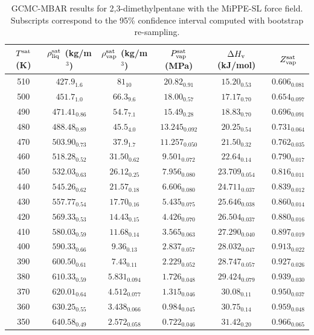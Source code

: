 \documentclass[journal=jctc,manuscript=article]{achemso}
\begin{document}
\begin{table}[htb!]
	\caption{GCMC-MBAR results for 2,3-dimethylpentane with the MiPPE-SL force field. Subscripts correspond to the 95\% confidence interval computed with bootstrap re-sampling.}
	\begin{center}
		\begin{tabular}{|c|c|c|c|c|c|}
			\hline
			$T^{\rm sat}$ (K) & $\rho_{\rm liq}^{\rm sat}$ (kg/m$^3$) & $\rho_{\rm vap}^{\rm sat}$ (kg/m$^3$) & $P_{\rm vap}^{\rm sat}$ (MPa) & $\Delta H_{\rm v}$ (kJ/mol) & $Z_{\rm vap}^{\rm sat}$ \\ \hline
			510 & $427.9_{1.6}$ & $81_{10}$ & $20.82_{0.91}$ & $15.20_{0.53}$ & $0.606_{0.081}$ \\
			500 & $451.7_{1.0}$ & $66.3_{9.6}$ & $18.00_{0.57}$ & $17.17_{0.70}$ & $0.654_{0.097}$ \\
			490 & $471.41_{0.86}$ & $54.7_{7.1}$ & $15.49_{0.28}$ & $18.83_{0.70}$ & $0.696_{0.091}$ \\
			480 & $488.48_{0.89}$ & $45.5_{4.0}$ & $13.245_{0.092}$ & $20.25_{0.54}$ & $0.731_{0.064}$ \\
			470 & $503.90_{0.73}$ & $37.9_{1.7}$ & $11.257_{0.050}$ & $21.50_{0.32}$ & $0.762_{0.035}$ \\
			460 & $518.28_{0.52}$ & $31.50_{0.62}$ & $9.501_{0.072}$ & $22.64_{0.14}$ & $0.790_{0.017}$ \\
			450 & $532.03_{0.63}$ & $26.12_{0.25}$ & $7.956_{0.080}$ & $23.709_{0.054}$ & $0.816_{0.011}$ \\
			440 & $545.26_{0.62}$ & $21.57_{0.18}$ & $6.606_{0.080}$ & $24.711_{0.037}$ & $0.839_{0.012}$ \\
			430 & $557.77_{0.54}$ & $17.70_{0.16}$ & $5.435_{0.075}$ & $25.646_{0.038}$ & $0.860_{0.014}$ \\
			420 & $569.33_{0.53}$ & $14.43_{0.15}$ & $4.426_{0.070}$ & $26.504_{0.037}$ & $0.880_{0.016}$ \\
			410 & $580.03_{0.59}$ & $11.68_{0.14}$ & $3.565_{0.063}$ & $27.290_{0.040}$ & $0.897_{0.019}$ \\
			400 & $590.33_{0.66}$ & $9.36_{0.13}$ & $2.837_{0.057}$ & $28.032_{0.047}$ & $0.913_{0.022}$ \\
			390 & $600.50_{0.61}$ & $7.43_{0.11}$ & $2.229_{0.052}$ & $28.747_{0.057}$ & $0.927_{0.026}$ \\
			380 & $610.33_{0.59}$ & $5.831_{0.094}$ & $1.726_{0.048}$ & $29.424_{0.079}$ & $0.939_{0.030}$ \\
			370 & $620.01_{0.64}$ & $4.512_{0.077}$ & $1.315_{0.046}$ & $30.08_{0.11}$ & $0.950_{0.037}$ \\
			360 & $630.25_{0.55}$ & $3.438_{0.066}$ & $0.984_{0.045}$ & $30.75_{0.14}$ & $0.959_{0.048}$ \\
			350 & $640.58_{0.49}$ & $2.572_{0.058}$ & $0.722_{0.046}$ & $31.42_{0.20}$ & $0.966_{0.065}$ \\
			\hline
		\end{tabular}
	\end{center}
\end{table}
\end{document}
